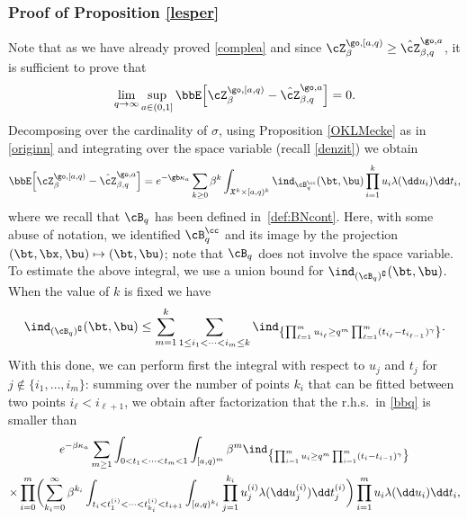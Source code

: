 \subsubsection{Proof of Proposition \ref{lesper}}

Note that as we have already proved \eqref{complea} and since $\cZ^{\go,[a,q)}_{\beta} \geq \hat \cZ^{\go,a}_{\beta,q}$, it is sufficient to prove that
\begin{equation}
\lim_{q \to \infty} \sup_{a\in(0,1]} \bbE\Bigl[ \cZ^{\go,[a,q)}_{\beta} -\hat \cZ^{\go,a}_{\beta,q} \Bigr]=0.
\end{equation}
Decomposing over the cardinality of $\sigma$, using Proposition \ref{OKLMecke} as in \eqref{originn} and integrating over the space variable (recall \eqref{denzit}) we obtain
\begin{equation}\label{bbq}
\bbE\Bigl[ \cZ^{\go,[a,q)}_{\beta} -\hat \cZ^{\go,a}_{\beta,q} \Bigr]
= e^{- \gb \kappa_a} \sum_{k\ge 0} \beta^k \int_{\mathfrak{X}^k \times [a,q)^k} \ind_{\cB^{\cc}_q}(\bt,\bu) \prod_{i=1}^k u_i \lambda(\dd u_i) \dd t_i,
\end{equation}
where we recall that $\cB_q$ has been defined in~\eqref{def:BNcont}.
Here, with some abuse of notation, we identified $\cB^{\cc}_q$ and its image by the projection $(\bt,\bx,\bu)\mapsto (\bt,\bu)$;
note that $\cB_q$ does not involve the space variable.
To estimate the above integral, we use a union bound for $\ind_{(\cB_q)^{\complement}}(\bt,\bu)$. When the value of $k$ is fixed we have
\begin{equation*}
\ind_{(\cB_q)^{\complement}}(\bt,\bu)
\le \sum_{m=1}^{k} \sum_{1\leq i_1<\dots <i_m \leq k } \ind_{\left\{ \prod_{\ell=1}^{m} u_{i_\ell} \ge q^{m} \prod_{\ell=1}^{m} (t_{i_\ell}-t_{i_{\ell-1}})^{\gamma} \right\} }.
\end{equation*}
With this done, we can perform first the integral with respect to $u_j$ and $t_j$ for $j\notin \{i_1, \ldots, i_m\}$:
summing over the number of points $k_i$ that can be fitted between two points $i_\ell< i_{\ell+1}$, we obtain after factorization that the r.h.s.\ in \eqref{bbq}
is smaller than\vspace*{-5pt}
\begin{multline}
e^{- \beta \kappa_a } \sum_{m\ge 1} \int_{0<t_1<\dots<t_m<1} \int_{[a,q)^m}
\beta^{m} \ind_{\bigl\{ \prod_{i=1}^{m} u_{i} \ge q^m \prod_{i=1}^{m} (t_{i}-t_{i-1})^{\gamma}\bigr\}} \label{eq:resteZ2a}\\
\times \prod_{i=0}^m \biggl(\sum_{k_i=0}^\infty \beta^{k_i} \int_{ t_{i}< t^{(i)}_1<\dots<t^{(i)}_{k_i}< t_{i+1} } \int_{[a,q)^{k_i}}
\prod_{j=1}^{k_i}
u^{(i)}_j \lambda(\dd u^{(i)}_j)\dd t^{(i)}_j \biggr)
\prod_{i=1}^m u_i \lambda(\dd u_i) \dd t_i,
\end{multline}
